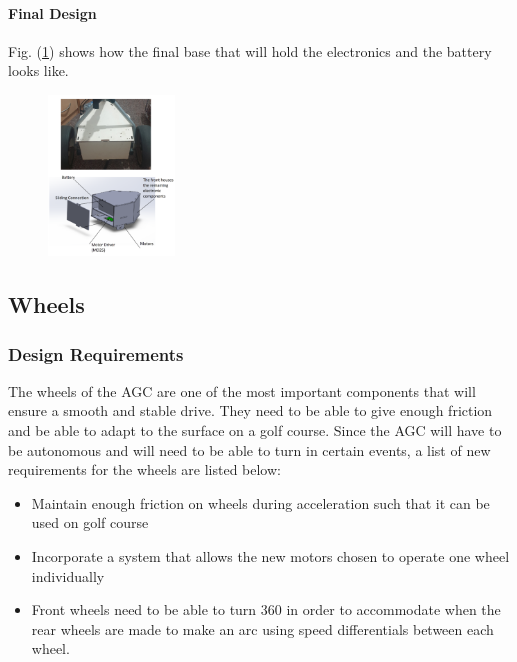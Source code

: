 \documentclass[11pt,landscape]{article}
\begin{document}
\begin{multicols}{3}
\paragraph{Final Design}
Fig. (\ref{fig:new_base}) shows how the final base that will hold the
electronics and the battery looks like.
\begin{figure}[H]
    \begin{center}
        \includegraphics[width=0.3\textwidth]{New AGC base.PNG}
        \label{fig:new_base}
    \end{center}
\end{figure}

\subsection{Wheels}
\subsubsection{Design Requirements}
The wheels of the AGC are one of the most important components that will
ensure a smooth and stable drive. They need to be able to give enough friction
and be able to adapt to the surface on a golf course. Since the AGC will have
to be autonomous and will need to be able to turn in certain events, a list of
new requirements for the wheels are listed below:

\begin{itemize}
    \item Maintain enough friction on wheels during acceleration such that it
    can be used on golf course
    \item Incorporate a system that allows the new motors chosen to operate one wheel individually
    \item Front wheels need to be able to turn 360 in order to accommodate when the rear wheels are made to make an arc using speed differentials between each wheel.
\end{itemize}


\end{multicols}
\end{document}
